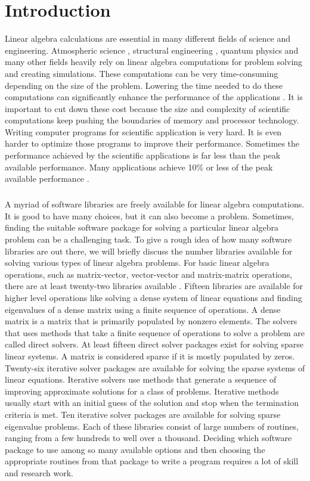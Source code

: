 \chapter{Introduction}
\label{introchap}

Linear algebra calculations are essential in many different fields of science and engineering. Atmospheric science \cite{whalley}, structural engineering \cite{spencer}, quantum physics \cite{vidal} and many other fields heavily rely on linear algebra computations for problem solving and creating simulations. These computations can be very time-consuming depending on the size of the problem. Lowering the time needed to do these computations can significantly enhance the performance of the applications \cite{chen}. It is important to cut down these cost because the size and complexity of scientific computations keep pushing the boundaries of memory and processor technology. Writing computer programs for scientific application is very hard. It is even harder to optimize those programs to improve their performance. Sometimes the performance achieved by the scientific applications is far less than the peak available performance. Many applications achieve 10\% or less of the peak available performance \cite{gropp}.

\paragraph{}
A myriad of software libraries are freely available for linear algebra computations. It is good to have many choices, but it can also become a problem. Sometimes, finding the suitable software package for solving a particular linear algebra problem can be a challenging task. To give a rough idea of how many software libraries are out there, we will briefly discuss the number libraries available for solving various types of linear algebra problems. For basic linear algebra operations, such as matrix-vector, vector-vector and matrix-matrix operations, there are at least twenty-two libraries available \cite{free}. Fifteen libraries are available for higher level operations like solving a dense system of linear equations and finding eigenvalues of a dense matrix using a finite sequence of operations. A dense matrix is a matrix that is primarily populated by nonzero elements. The solvers that uses methods that take a finite sequence of operations to solve a problem are called direct solvers. At least fifteen direct solver packages exist for solving sparse linear systems. A matrix is considered sparse if it is mostly populated by zeros. Twenty-six iterative solver packages are available for solving the sparse systems of linear equations. Iterative solvers use methods that generate a sequence of improving approximate solutions for a class of problems. Iterative methods usually start with an initial guess of the solution and stop when the termination criteria is met. Ten iterative solver packages are available for solving sparse eigenvalue problems. Each of these libraries consist of large numbers of routines, ranging from a few hundreds to well over a thousand. Deciding which software package to use among so many available options and then choosing the appropriate routines from that package to write a program requires a lot of skill and research work.

